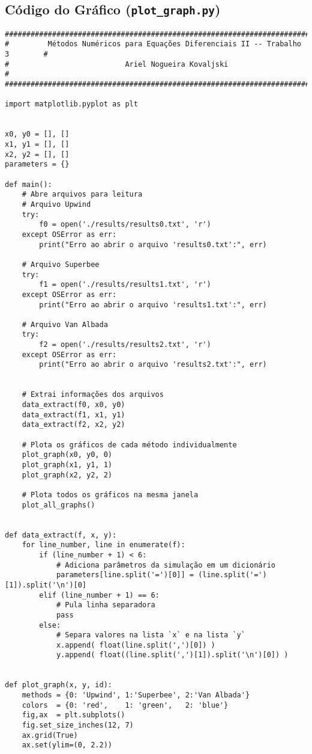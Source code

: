 \pagebreak
\subsection{Código do Gráfico (\texttt{plot\_graph.py})}

\begin{Verbatim}[fontsize=\footnotesize]
################################################################################
#         Métodos Numéricos para Equações Diferenciais II -- Trabalho 3        #
#                           Ariel Nogueira Kovaljski                           #
################################################################################

import matplotlib.pyplot as plt


x0, y0 = [], []
x1, y1 = [], []
x2, y2 = [], []
parameters = {}

def main():
    # Abre arquivos para leitura
    # Arquivo Upwind
    try:
        f0 = open('./results/results0.txt', 'r')
    except OSError as err:
        print("Erro ao abrir o arquivo 'results0.txt':", err)

    # Arquivo Superbee
    try:
        f1 = open('./results/results1.txt', 'r')
    except OSError as err:
        print("Erro ao abrir o arquivo 'results1.txt':", err)

    # Arquivo Van Albada
    try:
        f2 = open('./results/results2.txt', 'r')
    except OSError as err:
        print("Erro ao abrir o arquivo 'results2.txt':", err)


    # Extrai informações dos arquivos
    data_extract(f0, x0, y0)
    data_extract(f1, x1, y1)
    data_extract(f2, x2, y2)

    # Plota os gráficos de cada método individualmente
    plot_graph(x0, y0, 0)
    plot_graph(x1, y1, 1)
    plot_graph(x2, y2, 2)

    # Plota todos os gráficos na mesma janela
    plot_all_graphs()


def data_extract(f, x, y):
    for line_number, line in enumerate(f):
        if (line_number + 1) < 6:
            # Adiciona parâmetros da simulação em um dicionário
            parameters[line.split('=')[0]] = (line.split('=')[1]).split('\n')[0]
        elif (line_number + 1) == 6:
            # Pula linha separadora
            pass
        else:
            # Separa valores na lista `x` e na lista `y`
            x.append( float(line.split(',')[0]) )
            y.append( float((line.split(',')[1]).split('\n')[0]) )


def plot_graph(x, y, id):
    methods = {0: 'Upwind', 1:'Superbee', 2:'Van Albada'}
    colors  = {0: 'red',    1: 'green',   2: 'blue'}
    fig,ax  = plt.subplots()
    fig.set_size_inches(12, 7)
    ax.grid(True)
    ax.set(ylim=(0, 2.2))


\end{Verbatim}
